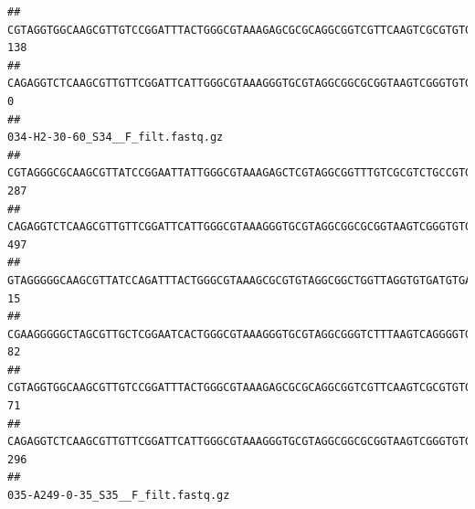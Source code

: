 \documentclass[]{article}
\begin{document}
\begin{verbatim}
## CGTAGGTGGCAAGCGTTGTCCGGATTTACTGGGCGTAAAGAGCGCGCAGGCGGTCGTTCAAGTCGCGTGTGAAAGCCCCCGGCTCAACTGGGGAGGGTCACGCGATACTGATCGACTCGAAGGCAGGAGAGGGTAGTGGAATTCCCGGTGTAGTGGTGAAATGCGTAGATATCGGGAGGAACACCAGTGGCGAAGGCGACTACCTGGCCTGTTCTTGACGCTGAGGCGCGAAAGCTAGGGGAGCAAACG                              138
## CAGAGGTCTCAAGCGTTGTTCGGATTCATTGGGCGTAAAGGGTGCGTAGGCGGCGCGGTAAGTCGGGTGTGAAATCTCGGGGCTTAACTCCGAAACTGCATTCGATACTGCCGTGCTTGAGGACTGGAGAGGAGACTGGAATTTACGGTGTAGCGGTGAAATGCGTAGATATCGTAAGGAAGACCAGTGGCGAAGGCGGGTCTCTGGACAGTTCCTGACGCTGAGGCACGAAGGCCAGGGGAGCAAACG                                0
##                                                                                                                                                                                                                                                           034-H2-30-60_S34__F_filt.fastq.gz
## CGTAGGGCGCAAGCGTTATCCGGAATTATTGGGCGTAAAGAGCTCGTAGGCGGTTTGTCGCGTCTGCCGTGAAAGTCCGGGGCTCAACTCCGGATCTGCGGTGGGTACGGGCAGACTAGAGTGATGTAGGGGAGACTGGAATTCCTGGTGTAGCGGTGAAATGCGCAGATATCAGGAGGAACACCGATGGCGAAGGCAGGTCTCTGGGCATTAACTGACGCTGAGGAGCGAAAGCATGGGGAGCGAACA                               287
## CAGAGGTCTCAAGCGTTGTTCGGATTCATTGGGCGTAAAGGGTGCGTAGGCGGCGCGGTAAGTCGGGTGTGAAATCTCGGAGCTTAACTCCGAAACTGCATTCGATACTGCCGTGCTTGAGGACTGGAGAGGAGACTGGAATTTACGGTGTAGCGGTGAAATGCGTAGATATCGTAAGGAAGACCAGTGGCGAAGGCGGGTCTCTGGACAGTTCCTGACGCTGAGGCACGAAGGCCAGGGGAGCAAACG                               497
## GTAGGGGGCAAGCGTTATCCAGATTTACTGGGCGTAAAGCGCGTGTAGGCGGCTGGTTAGGTGTGATGTGAAATCTTCCGGCTCAACCGGAAAACTGCATTGCAAACCGGCCTGGCTAGAGTGCAGGAGAGGGAAGCGGAATTCCAGGTGTAGCGGTGAAATGCGTAGATATCTGGAGGAACACCAGTGGCGAAGGCGGCTTCCTGGCCTGCAACTGACGCTGAGACGCGAAAGCGTGGGGAGCGAAC                                 15
## CGAAGGGGGCTAGCGTTGCTCGGAATCACTGGGCGTAAAGGGTGCGTAGGCGGGTCTTTAAGTCAGGGGTGAAATCCTGGAGCTCAACTCCAGAACTGCCTTTGATACTGAAGATCTTGAGTTCGGGAGAGGTGAGTGGAACTGCGAGTGTAGAGGTGAAATTCGTAGATATTCGCAAGAACACCAGTGGCGAAGGCGGCTCACTGGCCCGATACTGACGCTGAGGCACGAAAGCGTGGGGAGCAAACA                                82
## CGTAGGTGGCAAGCGTTGTCCGGATTTACTGGGCGTAAAGAGCGCGCAGGCGGTCGTTCAAGTCGCGTGTGAAAGCCCCCGGCTCAACTGGGGAGGGTCACGCGATACTGATCGACTCGAAGGCAGGAGAGGGTAGTGGAATTCCCGGTGTAGTGGTGAAATGCGTAGATATCGGGAGGAACACCAGTGGCGAAGGCGACTACCTGGCCTGTTCTTGACGCTGAGGCGCGAAAGCTAGGGGAGCAAACG                                71
## CAGAGGTCTCAAGCGTTGTTCGGATTCATTGGGCGTAAAGGGTGCGTAGGCGGCGCGGTAAGTCGGGTGTGAAATCTCGGGGCTTAACTCCGAAACTGCATTCGATACTGCCGTGCTTGAGGACTGGAGAGGAGACTGGAATTTACGGTGTAGCGGTGAAATGCGTAGATATCGTAAGGAAGACCAGTGGCGAAGGCGGGTCTCTGGACAGTTCCTGACGCTGAGGCACGAAGGCCAGGGGAGCAAACG                               296
##                                                                                                                                                                                                                                                           035-A249-0-35_S35__F_filt.fastq.gz

\end{verbatim}
\end{document}

